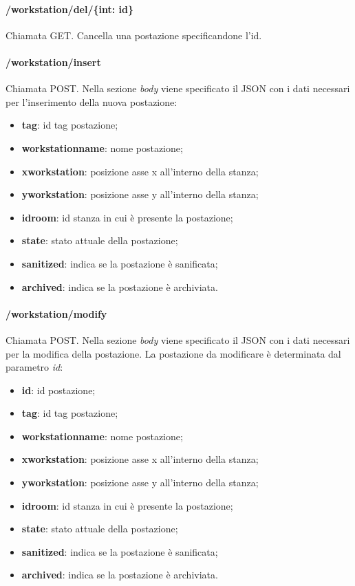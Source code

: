 \paragraph{/workstation/del/\{int: id\}}
Chiamata GET. Cancella una postazione specificandone l'id.
\paragraph{/workstation/insert}
Chiamata POST. Nella sezione \textit{body} viene specificato il JSON con i dati necessari per l'inserimento della nuova postazione:
\begin{itemize}
	\item \textbf{tag}: id tag postazione;
	\item \textbf{workstationname}: nome postazione;
	\item \textbf{xworkstation}: posizione asse x all'interno della stanza;
	\item \textbf{yworkstation}: posizione asse y all'interno della stanza;	
	\item \textbf{idroom}: id stanza in cui è presente la postazione;	
	\item \textbf{state}: stato attuale della postazione;	
	\item \textbf{sanitized}: indica se la postazione è sanificata;	
	\item \textbf{archived}: indica se la postazione è archiviata.	
\end{itemize}
\paragraph{/workstation/modify}
Chiamata POST. Nella sezione \textit{body} viene specificato il JSON con i dati necessari per la modifica della postazione. La postazione da modificare è determinata dal parametro \textit{id}:
\begin{itemize}
	\item \textbf{id}: id postazione;
	\item \textbf{tag}: id tag postazione;
	\item \textbf{workstationname}: nome postazione;
	\item \textbf{xworkstation}: posizione asse x all'interno della stanza;
	\item \textbf{yworkstation}: posizione asse y all'interno della stanza;	
	\item \textbf{idroom}: id stanza in cui è presente la postazione;	
	\item \textbf{state}: stato attuale della postazione;	
	\item \textbf{sanitized}: indica se la postazione è sanificata;	
	\item \textbf{archived}: indica se la postazione è archiviata.	
\end{itemize}
